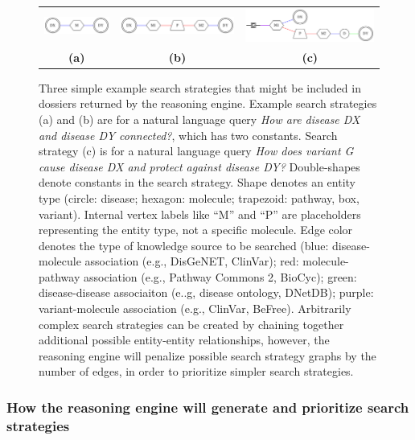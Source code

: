 \documentclass[11pt,notitlepage]{article}
\begin{document}
\begin{figure}[h!]
  \begin{tabular}{ccc}
    \includegraphics[width=1.2in]{net6.png} &
    \includegraphics[width=2.2in]{net7.png} & 
    \includegraphics[width=2.5in]{net8.png} \\
                    {\bf (a)} & {\bf (b)} & {\bf (c)}
                    \end{tabular}
  \caption{Three simple example search strategies that might be included in
    dossiers returned by the reasoning engine. Example search strategies (a) and
    (b) are for a natural language query {\em How are disease DX and disease DY
    connected?\/}, which has two constants.  Search strategy (c) is for a natural
    language query {\em How does variant G cause disease DX and protect against
    disease DY?}  Double-shapes denote constants in the search strategy. Shape
    denotes an entity type (circle: disease; hexagon: molecule; trapezoid:
    pathway, box, variant). Internal vertex labels like ``M'' and ``P'' are
    placeholders representing the entity type, not a specific molecule. Edge
    color denotes the type of knowledge source to be searched (blue:
    disease-molecule association (e.g., DisGeNET, ClinVar); red:
    molecule-pathway association (e.g., Pathway Commons 2, BioCyc); green:
    disease-disease associaiton (e..g, disease ontology, DNetDB); purple:
    variant-molecule association (e.g., ClinVar, BeFree). Arbitrarily complex
    search strategies can be created by chaining together additional possible
    entity-entity relationships, however, the reasoning engine will penalize
    possible search strategy graphs by the number of edges, in order to
    prioritize simpler search strategies.}
  \label{fig:ugraph}
\end{figure}

\subsubsection{How the reasoning engine will generate and prioritize search
  strategies}
\end{document}
